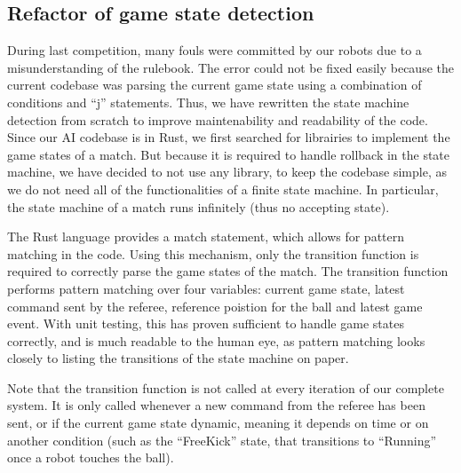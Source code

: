 \subsection{Refactor of game state detection}
During last competition, many fouls were committed by our robots due to a
misunderstanding of the rulebook. The error could not be fixed easily because
the current codebase was parsing the current game state using a combination of conditions and ``j'' statements.
Thus, we have rewritten the state machine detection from scratch to improve maintenability
and readability of the code. Since our AI codebase is in Rust, we first searched for
librairies to implement the game states of a match. But because it is required
to handle rollback in the state machine, we have decided to not use any library,
to keep the codebase simple, as we do not need all of the functionalities of a finite state machine.
In particular, the state machine of a match runs infinitely (thus no accepting state).

The Rust language provides a match statement, which allows for pattern matching in the code.
Using this mechanism, only the transition function is required to correctly parse the game states
of the match. The transition function performs pattern matching over four variables:
current game state, latest command sent by the referee, reference poistion for the ball and latest
game event. With unit testing, this has proven sufficient to handle game states correctly,
and is much readable to the human eye, as pattern matching looks closely to listing the transitions
of the state machine on paper.

Note that the transition function is not called at every iteration of our complete system.
It is only called whenever a new command from the referee has been sent, or if the current
game state dynamic, meaning it depends on time or on another condition (such as the ``FreeKick'' state,
that transitions to ``Running'' once a robot touches the ball).